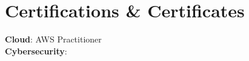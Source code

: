 \section{Certifications \& Certificates}

\begin{itemize}[leftmargin=0.15in, label={}]
	\small{\item{
		\textbf{Cloud}{: AWS Practitioner} \\
		\textbf{Cybersecurity}{: } \\
	}}
\end{itemize}